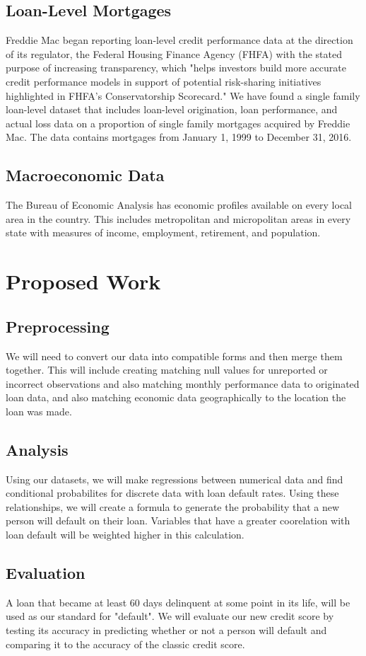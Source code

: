 \documentclass[sigconf, 11pt]{acmart}
\begin{document}
\subsection{Loan-Level Mortgages}
Freddie Mac began reporting loan-level credit performance data at the direction of its regulator, the Federal Housing Finance Agency (FHFA) with the stated purpose of increasing transparency, which "helps investors build more accurate credit performance models in support of potential risk-sharing initiatives highlighted in FHFA's Conservatorship Scorecard." We have found a single family loan-level dataset that includes loan-level origination, loan performance, and actual loss data on a proportion of single family mortgages acquired by Freddie Mac. The data contains mortgages from January 1, 1999 to December 31, 2016. 
\subsection{Macroeconomic Data}
The Bureau of Economic Analysis has economic profiles available on every local area in the country. This includes metropolitan and micropolitan areas in every state with measures of income, employment, retirement, and population. 

\section{Proposed Work}
\subsection{Preprocessing}
We will need to convert our data into compatible forms and then merge them together. This will include creating matching null values for unreported or incorrect observations and also matching monthly performance data to originated loan data, and also matching economic data geographically to the location the loan was made.
\subsection{Analysis}
Using our datasets, we will make regressions between numerical data and find conditional probabilites for discrete data with loan default rates. Using these relationships, we will create a formula to generate the probability that a new person will default on their loan. Variables that have a greater coorelation with loan default will be weighted higher in this calculation.

\subsection{Evaluation}
A loan that became at least 60 days delinquent at some point in its life, will be used as our standard for "default". We will evaluate our new credit score by testing its accuracy in predicting whether or not a person will default and comparing it to the accuracy of the classic credit score.
\end{document}
